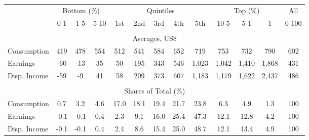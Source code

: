 \begin{tabular}{l c c c| c c c c c| c c c| c}
\toprule
&\multicolumn{3}{c|}{Bottom (\%)} & \multicolumn{5}{c|}{Quintiles} & \multicolumn{3}{c|}{Top (\%)} & All  \\
& 0-1 & 1-5 & 5-10 &  1st & 2nd & 3rd & 4th & 5th & 10-5 & 5-1 & 1 & 0-100 \\
\midrule \\
\multicolumn{13}{c}{Averages, US\$} \\
\midrule
Consumption  & 419  & 478  & 554  & 512  & 541  & 584  & 652  & 719  & 753  & 732  & 790  & 602 \\
Earnings         & -60 & -13 & 35 & 50 & 195 & 343 & 546 & 1,023 & 1,042 & 1,410 & 1,868 & 431 \\
Disp. Income & -59 & -9 & 41 & 58 & 209 & 373 & 607 & 1,183 & 1,179 & 1,622 & 2,437 & 486 \\
\midrule \\
\multicolumn{13}{c}{Shares of Total (\%)} \\
\midrule
Consumption  & 0.7   & 3.2   & 4.6   & 17.0   & 18.1   & 19.4   & 21.7   & 23.8   & 6.3   & 4.9   & 1.3   & 100 \\
Earnings         & -0.1  & -0.1  & 0.4  & 2.3  & 9.1  & 16.0  & 25.4  & 47.3  & 12.1  & 12.8  & 4.2  & 100 \\
Disp. Income & -0.1  & -0.1  & 0.4  & 2.4  & 8.6  & 15.4  & 25.0  & 48.7  & 12.1  & 13.4  & 4.9  & 100 \\
\bottomrule
\end{tabular}